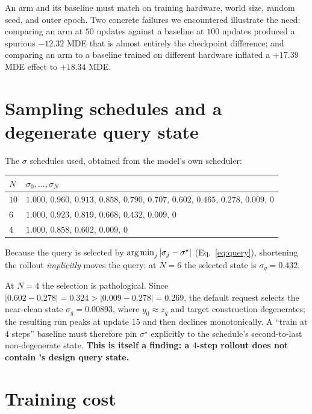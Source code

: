 An arm and its baseline must match on training hardware, world size, random seed, and
outer epoch. Two concrete failures we encountered illustrate the need:
comparing an arm at $50$ updates against a baseline at $100$ updates produced a spurious
$-12.32$ MDE that is almost entirely the checkpoint difference; and comparing an arm to a
baseline trained on different hardware inflated a $+17.39$ MDE effect to $+18.34$ MDE.

\section{Sampling schedules and a degenerate query state}
\label{app:schedule}

The $\sigma$ schedules used, obtained from the model's own scheduler:
\begin{center}
\begin{tabular}{ll}
\toprule
$N$ & $\sigma_0,\dots,\sigma_N$\\
\midrule
$10$ & $1.000,\,0.960,\,0.913,\,0.858,\,0.790,\,0.707,\,0.602,\,0.465,\,\mathbf{0.278},\,0.009,\,0$\\
$6$  & $1.000,\,0.923,\,0.819,\,0.668,\,\mathbf{0.432},\,0.009,\,0$\\
$4$  & $1.000,\,0.858,\,\mathbf{0.602},\,0.009,\,0$\\
\bottomrule
\end{tabular}
\end{center}
Because the query is selected by $\operatorname*{arg\,min}_j|\sigma_j-\sigma^\star|$
(Eq.~\eqref{eq:query}), shortening the rollout \emph{implicitly} moves the query: at
$N\!=\!6$ the selected state is $\sigma_q=0.432$.

At $N\!=\!4$ the selection is pathological. Since
$|0.602-0.278|=0.324>|0.009-0.278|=0.269$, the default request selects the near-clean
state $\sigma_q=0.00893$, where $y_0\approx z_q$ and target construction degenerates; the
resulting run peaks at update $15$ and then declines monotonically. A ``train at $4$
steps'' baseline must therefore pin $\sigma^\star$ explicitly to the schedule's
second-to-last non-degenerate state. \textbf{This is itself a finding: a $4$-step rollout
does not contain \opsd's design query state.}

\section{Training cost}
\label{app:cost}


